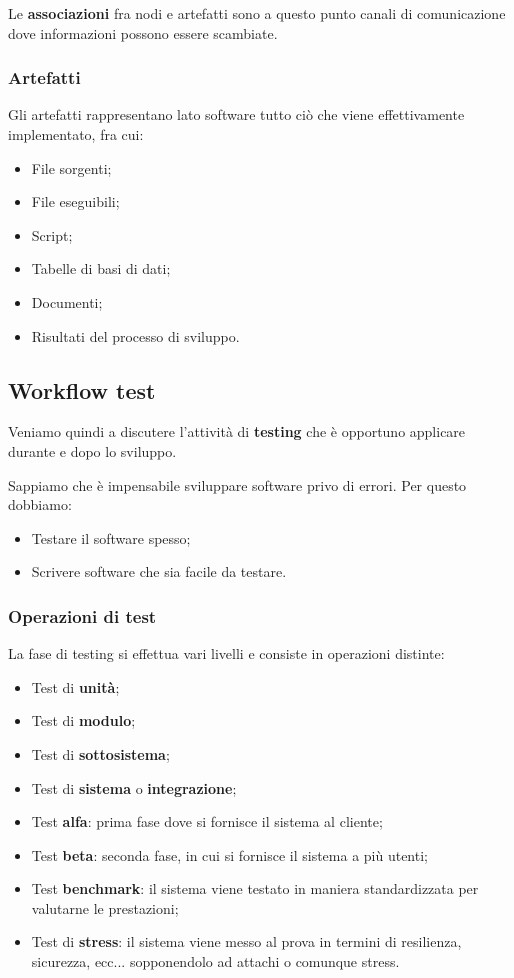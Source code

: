 \documentclass[a4paper,11pt]{article}
\begin{document}
Le \textbf{associazioni} fra nodi e artefatti sono a questo punto canali di comunicazione dove informazioni possono essere scambiate.

\subsubsection{Artefatti}
Gli artefatti rappresentano lato software tutto ciò che viene effettivamente implementato, fra cui:

\begin{itemize}
	\item File sorgenti;
	\item File eseguibili;
	\item Script;
	\item Tabelle di basi di dati;
	\item Documenti;
	\item Risultati del processo di sviluppo.
\end{itemize}

\subsection{Workflow test}
Veniamo quindi a discutere l'attività di \textbf{testing} che è opportuno applicare durante e dopo lo sviluppo.

Sappiamo che è impensabile sviluppare software privo di errori.
Per questo dobbiamo:
\begin{itemize}
	\item Testare il software spesso;
	\item Scrivere software che sia facile da testare.
\end{itemize}

\subsubsection{Operazioni di test}
La fase di testing si effettua vari livelli e consiste in operazioni distinte:
\begin{itemize}
	\item Test di \textbf{unità};
	\item Test di \textbf{modulo};
	\item Test di \textbf{sottosistema};
	\item Test di \textbf{sistema} o \textbf{integrazione};
	\item Test \textbf{alfa}: prima fase dove si fornisce il sistema al cliente;
	\item Test \textbf{beta}: seconda fase, in cui si fornisce il sistema a più utenti;
	\item Test \textbf{benchmark}: il sistema viene testato in maniera standardizzata per valutarne le prestazioni;
	\item Test di \textbf{stress}: il sistema viene messo al prova in termini di resilienza, sicurezza, ecc... sopponendolo ad attachi o comunque stress.
\end{itemize}
\end{document}
